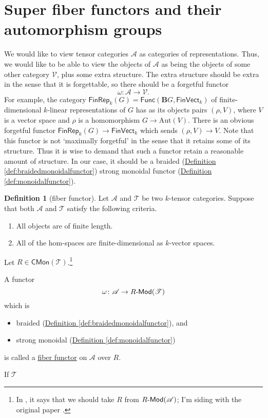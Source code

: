 \documentclass[a4paper,10pt]{scrreprt}
\newcommand{\defn}[1]{\ul{#1}}
\def\mhyp{{\hbox{-}}}
\theoremstyle{definition}
\newtheorem{definition}{Definition}[section]
\theoremstyle{plain}
\theoremstyle{remark}
\begin{document}
\section{Super fiber functors and their automorphism groups}
We would like to view tensor categories $\mathscr{A}$ as categories of representations. Thus, we would like to be able to view the objects of $\mathscr{A}$ as being the objects of some other category $\mathscr{V}$, plus some extra structure. The extra structure should be extra in the sense that it is forgettable, so there should be a forgetful functor
\begin{equation*}
  \omega\colon \mathscr{A} \rightarrow \mathscr{V}.
\end{equation*}
For example, the category $\mathsf{FinRep}_{k}(G) = \mathsf{Func}(\mathbf{B}G, \mathsf{FinVect}_{k})$ of finite-dimensional $k$-linear representations of $G$ has as its objects pairs $(\rho, V)$, where $V$ is a vector space and $\rho$ is a homomorphism $G \to \mathrm{Aut}(V)$. There is an obvious forgetful functor $\mathsf{FinRep}_{k}(G) \to \mathsf{FinVect}_{k}$ which sends $(\rho, V) \to V$. Note that this functor is not `maximally forgetful' in the sense that it retains some of its structure. Thus it is wise to demand that such a functor retain a reasonable amount of structure. In our case, it should be a braided (\hyperref[def:braidedmonoidalfunctor]{Definition \ref*{def:braidedmonoidalfunctor}}) strong monoidal functor (\hyperref[def:monoidalfunctor]{Definition \ref*{def:monoidalfunctor}}).

\begin{definition}[fiber functor]
  \label{def:fiberfunctor}
  Let $\mathscr{A}$ and $\mathscr{T}$ be two $k$-tensor categories. Suppose that both $\mathscr{A}$ and $\mathscr{T}$ satisfy the following criteria.
  \begin{enumerate}
    \item All objects are of finite length.

    \item All of the hom-spaces are finite-dimensional as $k$-vector spaces.
  \end{enumerate}

  Let $R \in \mathsf{CMon}(\mathscr{T})$.\footnote{In \cite{nlab-deligne-theorem}, it says that we should take $R$ from $R\mhyp\mathsf{Mod}(\mathscr{A})$; I'm siding with the original paper \cite{deligne-categories-tensorielle}.}

  A functor
  \begin{equation*}
    \omega\colon \mathscr{A} \to R\mhyp\mathsf{Mod}(\mathscr{T})
  \end{equation*}
  which is
  \begin{itemize}
    \item braided (\hyperref[def:braidedmonoidalfunctor]{Definition \ref*{def:braidedmonoidalfunctor}}), and

    \item strong monoidal (\hyperref[def:monoidalfunctor]{Definition \ref*{def:monoidalfunctor}})
  \end{itemize}
  is called a \defn{fiber functor} on $\mathscr{A}$ over $R$.

  If $\mathscr{T}$
\end{definition}
\end{document}
